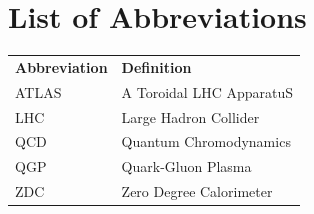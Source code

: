 \section*{List of Abbreviations}

\begin{table}[H]
    \centering
    \begin{tabular}{ll}
        \textbf{Abbreviation} & \textbf{Definition} \\
        ATLAS & A Toroidal LHC ApparatuS \\
        LHC & Large Hadron Collider \\
        QCD & Quantum Chromodynamics \\
        QGP & Quark-Gluon Plasma \\
        ZDC & Zero Degree Calorimeter \\
    \end{tabular}
\end{table}
